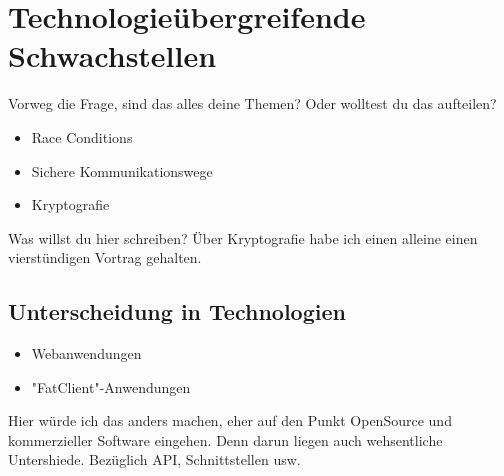 \section{Technologieübergreifende Schwachstellen}

Vorweg die Frage, sind das alles deine Themen? Oder wolltest du das aufteilen?

\begin{itemize}
   \item Race Conditions
   \item Sichere Kommunikationswege
   \item Kryptografie
\end{itemize}

Was willst du hier schreiben? Über Kryptografie habe ich einen alleine einen vierstündigen Vortrag gehalten.


\subsection{Unterscheidung in Technologien}

\begin{itemize}
   \item Webanwendungen
   \item "FatClient"-Anwendungen
\end{itemize}

Hier würde ich das anders machen, eher auf den Punkt OpenSource und kommerzieller Software eingehen. Denn darun liegen auch wehsentliche Untershiede. Bezüglich API, Schnittstellen usw.


